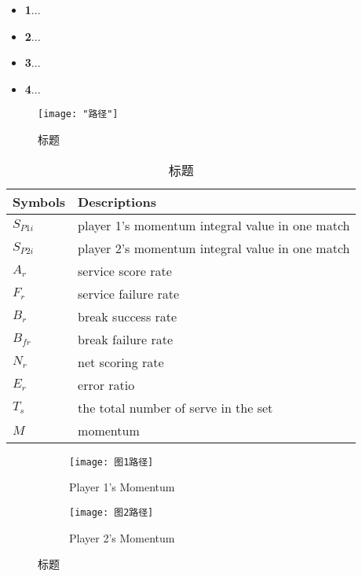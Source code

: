 \begin{itemize}
\item {\bf 1}...        
\item {\bf 2}...    
\item {\bf 3}...
\item {\bf 4}...
\end{itemize}

\begin{figure}[h]   
\centering          
\texttt{[image: "路径"]}
\caption{标题} \label{fig1}    
\end{figure}

\begin{table}[h] 
\centering  
\caption{标题}  
\label{tab1} 
\begin{tabular}{ll} 
\toprule
Symbols  & Descriptions \\    
\midrule 
$S_{P1i}$ & player 1’s momentum integral value in one match\\
$S_{P2i}$ & player 2’s momentum integral value in one match\\
$A_r$   & service score rate                             \\
$F_r$   & service failure rate                           \\
$B_r$   & break success rate                             \\
$B_{fr}$  & break failure rate                             \\
$N_r$   & net scoring rate                               \\
$E_r$   & error ratio                                    \\ 
$T_s$   & the total number of serve in the set           \\
$M$     & momentum                                       \\
\bottomrule
\end{tabular}
\end{table}

\begin{figure}[H]
    \centering
    \begin{subfigure}{0.45\textwidth}
        \centering
        \texttt{[image: 图1路径]}
        \caption{Player 1's Momentum}
        \label{subfig:player1}
    \end{subfigure}
    \hfill
    \begin{subfigure}{0.45\textwidth}
        \centering
        \texttt{[image: 图2路径]}
        \caption{Player 2's Momentum}
        \label{subfig:player2}
    \end{subfigure}
    \caption{标题}
    \label{Figure 13}
\end{figure}

